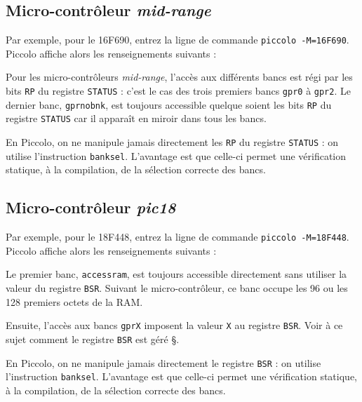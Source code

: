 \subsection{Micro-contrôleur \emph{mid-range}}

Par exemple, pour le 16F690, entrez la ligne de commande \texttt{piccolo -M=16F690}. Piccolo affiche alors les renseignements suivants :

{\footnotesize }

Pour les micro-contrôleurs \emph{mid-range}, l'accès aux différents bancs est régi par les bits \texttt{RP} du registre \texttt{STATUS} : c'est le cas des trois premiers bancs \texttt{gpr0} à \texttt{gpr2}. Le dernier banc, \texttt{gprnobnk}, est toujours accessible quelque soient les bits \texttt{RP} du registre \texttt{STATUS} car il apparaît en miroir dans tous les bancs.

En Piccolo, on ne manipule jamais directement les \texttt{RP} du registre \texttt{STATUS} : on utilise l'instruction \texttt{banksel}. L'avantage est que celle-ci permet une vérification statique, à la compilation, de la sélection correcte des bancs.


\subsection{Micro-contrôleur \emph{pic18}}

Par exemple, pour le 18F448, entrez la ligne de commande \texttt{piccolo -M=18F448}. Piccolo affiche alors les renseignements suivants :

{\footnotesize }

Le premier banc, \texttt{accessram}, est toujours accessible directement sans utiliser la valeur du registre \texttt{BSR}. Suivant le micro-contrôleur, ce banc occupe les 96 ou les 128 premiers octets de la RAM.

Ensuite, l'accès aux bancs \texttt{gprX} imposent la valeur \texttt{X} au registre \texttt{BSR}. Voir à ce sujet comment le registre \texttt{BSR} est géré §.

En Piccolo, on ne manipule jamais directement le registre \texttt{BSR} : on utilise l'instruction \texttt{banksel}. L'avantage est que celle-ci permet une vérification statique, à la compilation, de la sélection correcte des bancs.







